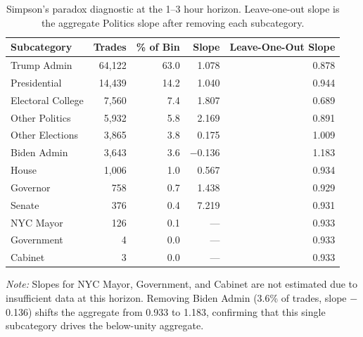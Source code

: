\documentclass[11pt,a4paper]{article}
\begin{document}
\begin{table}[!ht]
\caption{Simpson's paradox diagnostic at the 1--3 hour horizon. Leave-one-out slope is the aggregate Politics slope after removing each subcategory.\label{tab:simpsons}}
\centering
\begin{tabular}{lrrrr}
\toprule
Subcategory & Trades & \% of Bin & Slope & Leave-One-Out Slope \\
\midrule
Trump Admin       & 64{,}122 & 63.0 & 1.078 & 0.878 \\
Presidential      & 14{,}439 & 14.2 & 1.040 & 0.944 \\
Electoral College  &  7{,}560 &  7.4 & 1.807 & 0.689 \\
Other Politics     &  5{,}932 &  5.8 & 2.169 & 0.891 \\
Other Elections    &  3{,}865 &  3.8 & 0.175 & 1.009 \\
Biden Admin        &  3{,}643 &  3.6 & $-$0.136 & 1.183 \\
House              &  1{,}006 &  1.0 & 0.567 & 0.934 \\
Governor           &    758   &  0.7 & 1.438 & 0.929 \\
Senate             &    376   &  0.4 & 7.219 & 0.931 \\
NYC Mayor          &    126   &  0.1 & ---   & 0.933 \\
Government         &      4   &  0.0 & ---   & 0.933 \\
Cabinet            &      3   &  0.0 & ---   & 0.933 \\
\bottomrule
\end{tabular}
\begin{flushleft}
\small\textit{Note:} Slopes for NYC Mayor, Government, and Cabinet are not estimated due to insufficient data at this horizon. Removing Biden Admin (3.6\% of trades, slope $-$0.136) shifts the aggregate from 0.933 to 1.183, confirming that this single subcategory drives the below-unity aggregate.
\end{flushleft}
\end{table}
\end{document}
